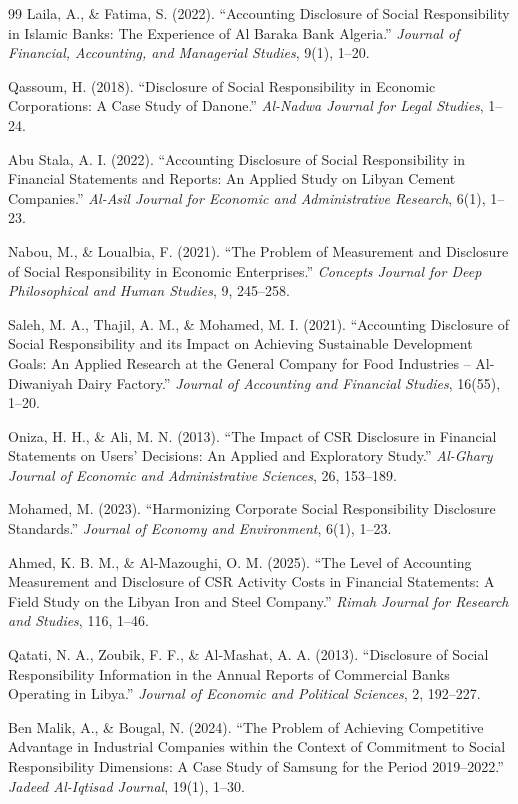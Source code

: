\documentclass[10pt]{NSP1}
\begin{document}
\begin{thebibliography}{99}
Laila, A., \& Fatima, S. (2022). ``Accounting Disclosure of Social Responsibility in Islamic Banks: The Experience of Al Baraka Bank Algeria.'' \emph{Journal of Financial, Accounting, and Managerial Studies}, 9(1), 1--20.

Qassoum, H. (2018). ``Disclosure of Social Responsibility in Economic Corporations: A Case Study of Danone.'' \emph{Al-Nadwa Journal for Legal Studies}, 1--24.

Abu Stala, A. I. (2022). ``Accounting Disclosure of Social Responsibility in Financial Statements and Reports: An Applied Study on Libyan Cement Companies.'' \emph{Al-Asil Journal for Economic and Administrative Research}, 6(1), 1--23.

Nabou, M., \& Loualbia, F. (2021). ``The Problem of Measurement and Disclosure of Social Responsibility in Economic Enterprises.'' \emph{Concepts Journal for Deep Philosophical and Human Studies}, 9, 245--258.

Saleh, M. A., Thajil, A. M., \& Mohamed, M. I. (2021). ``Accounting Disclosure of Social Responsibility and its Impact on Achieving Sustainable Development Goals: An Applied Research at the General Company for Food Industries – Al-Diwaniyah Dairy Factory.'' \emph{Journal of Accounting and Financial Studies}, 16(55), 1--20.

Oniza, H. H., \& Ali, M. N. (2013). ``The Impact of CSR Disclosure in Financial Statements on Users' Decisions: An Applied and Exploratory Study.'' \emph{Al-Ghary Journal of Economic and Administrative Sciences}, 26, 153--189.

Mohamed, M. (2023). ``Harmonizing Corporate Social Responsibility Disclosure Standards.'' \emph{Journal of Economy and Environment}, 6(1), 1--23.

Ahmed, K. B. M., \& Al-Mazoughi, O. M. (2025). ``The Level of Accounting Measurement and Disclosure of CSR Activity Costs in Financial Statements: A Field Study on the Libyan Iron and Steel Company.'' \emph{Rimah Journal for Research and Studies}, 116, 1--46.

Qatati, N. A., Zoubik, F. F., \& Al-Mashat, A. A. (2013). ``Disclosure of Social Responsibility Information in the Annual Reports of Commercial Banks Operating in Libya.'' \emph{Journal of Economic and Political Sciences}, 2, 192--227.

Ben Malik, A., \& Bougal, N. (2024). ``The Problem of Achieving Competitive Advantage in Industrial Companies within the Context of Commitment to Social Responsibility Dimensions: A Case Study of Samsung for the Period 2019--2022.'' \emph{Jadeed Al-Iqtisad Journal}, 19(1), 1--30.


\end{thebibliography}
\end{document}
